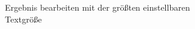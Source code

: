 \documentclass[notables, nomenclature, oneside, 150]{HSMW-Thesis}
\begin{document}
\begin{figure}[h]
\begin{subfigure}[t]{0.3\textwidth}
        	\caption{Ergebnis bearbeiten mit der größten einstellbaren Textgröße}
        	\label{fig:z4}
    	\end{subfigure}
		\begin{subfigure}[t]{0.3\textwidth}

\end{subfigure}
\end{figure}
\end{document}
